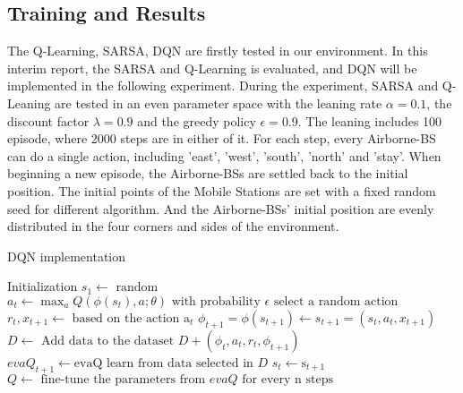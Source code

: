 \documentclass[
12pt, %
a4paper, %
oneside, %
headinclude,footinclude, %
BCOR5mm, %
]{scrartcl}
\begin{document}
\subsection{Training and Results}
\noindent The Q-Learning, SARSA, DQN are firstly tested in our environment. In this interim report, the SARSA and Q-Learning is evaluated, and DQN will be implemented in the following experiment. During the experiment, SARSA and Q-Leaning are tested in an even parameter space with the leaning rate $\alpha = 0.1$, the discount factor $\lambda=0.9$ and the greedy policy $\epsilon=0.9$. The leaning includes 100 episode, where 2000 steps are in either of it. For each step, every Airborne-BS can do a single action, including 'east', 'west', 'south', 'north' and 'stay'. When beginning a new episode, the Airborne-BSs are settled back to the initial position. The initial points of the Mobile Stations are set with a fixed random seed for different algorithm. And the Airborne-BSs' initial position are evenly distributed in the four corners and sides of the environment. \\

\begin{algorithm}
	\caption{DQN implementation}
	\label{alg2}
	\begin{algorithmic}[1]
		\STATE Initialization
    \STATE $s_{1} \leftarrow \text { random }$
    \STATE $ a_{t}\leftarrow \max _{a} Q\left(\phi\left(s_{t}\right), a ; \theta\right)\text { with probability } \epsilon \text { select a random action } $
    \STATE $ r_{t}, x_{t+1} \leftarrow \text { based on the action } \mathrm{a}_{t}$
		\STATE $\phi_{t+1}=\phi\left(s_{t+1}\right)\leftarrow s_{t+1}=\left(s_{t}, a_{t}, x_{t+1}\right)$
		\STATE $D \leftarrow \text { Add data to the dataset } D+\left(\phi_{t}, a_{t}, r_{t}, \phi_{t+1}\right)$
    \STATE $ eva Q_{t+1} \leftarrow \text {evaQ learn from data selected in } D$
    \STATE $s_{t} \leftarrow \mathrm{s}_{t+1} $
    \ENDFOR
		\STATE $ Q \leftarrow \text{ fine-tune the parameters from }  evaQ \text{ for every n steps} $
		\ENDFOR
		\ENDFOR
	\end{algorithmic}
\end{algorithm}







%
%
\end{document}
